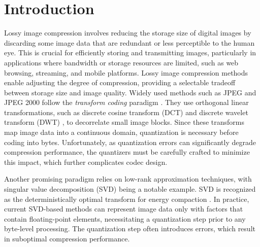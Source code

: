 \section{Introduction} \label{sec:introduction}

Lossy image compression involves reducing the storage size of digital images by discarding some image data that are redundant or less perceptible to the human eye. This is crucial for efficiently storing and transmitting images, particularly in applications where bandwidth or storage resources are limited, such as web browsing, streaming, and mobile platforms. Lossy image compression methods enable adjusting the degree of compression, providing a selectable tradeoff between storage size and image quality. Widely used methods such as JPEG \cite{wallace1991jpeg} and JPEG 2000 \cite{skodras2001jpeg} follow the \emph{transform coding} paradigm \cite{goyal2001theoretical}. They use orthogonal linear transformations, such as discrete cosine transform (DCT) \cite{ahmed1974discrete} and discrete wavelet transform (DWT) \cite{antonini1992image}, to decorrelate small image blocks. Since these transforms map image data into a continuous domain, quantization is necessary before coding into bytes. Unfortunately, as quantization errors can significantly degrade compression performance, the quantizers must be carefully crafted to minimize this impact, which further complicates codec design.

Another promising paradigm relies on low-rank approximation techniques, with singular value decomposition (SVD) being a notable example. SVD is recognized as the deterministically optimal transform for energy compaction \cite{andrews1976singular}. In practice, current SVD-based methods \cite{andrews1976singular, prasantha2007image, hou2015sparse} can represent image data only with factors that contain floating-point elements, necessitating a quantization step prior to any byte-level processing. The quantization step often introduces errors, which result in suboptimal compression performance.


